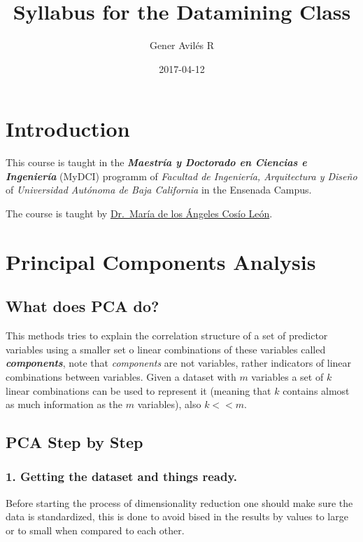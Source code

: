 \documentclass[]{book}
\title{Syllabus for the Datamining Class}
\author{Gener Avilés R}
\date{2017-04-12}
\begin{document}
\maketitle

{
\setcounter{tocdepth}{1}
\tableofcontents
}
\chapter{Introduction}\label{introduction}

This course is taught in the \textbf{\emph{Maestría y Doctorado en
Ciencias e Ingeniería}} (MyDCI) programm of \emph{Facultad de
Ingeniería, Arquitectura y Diseño} of \emph{Universidad Autónoma de Baja
California} in the Ensenada Campus.

The course is taught by
\href{https://www.researchgate.net/profile/Maria_Cosio_Leon}{Dr.~María
de los Ángeles Cosío León}.

\chapter{Principal Components Analysis}\label{intro}

\section{What does PCA do?}\label{what-does-pca-do}

This methods tries to explain the correlation structure of a set of
predictor variables using a smaller set o linear combinations of these
variables called \textbf{\emph{components}}, note that \emph{components}
are not variables, rather indicators of linear combinations between
variables. Given a dataset with \(m\) variables a set of \(k\) linear
combinations can be used to represent it (meaning that \(k\) contains
almost as much information as the \(m\) variables), also \(k<<m\).

\section{PCA Step by Step}\label{pca-step-by-step}

\subsection{1. Getting the dataset and things
ready.}\label{getting-the-dataset-and-things-ready.}

Before starting the process of dimensionality reduction one should make
sure the data is standardized, this is done to avoid bised in the
results by values to large or to small when compared to each other.
\end{document}
